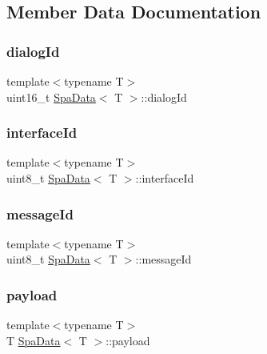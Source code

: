 \subsection{Member Data Documentation}
\mbox{\label{structSpaData_ac0b96669c8271ace6706c70008c59981}} 
\subsubsection{\texorpdfstring{dialog\+Id}{dialogId}}
{\footnotesize\ttfamily template$<$typename T$>$ \\
uint16\+\_\+t \hyperlink{structSpaData}{Spa\+Data}$<$ T $>$\+::dialog\+Id}

\mbox{\label{structSpaData_a4058e924739e721a3a006db80e609576}} 
\subsubsection{\texorpdfstring{interface\+Id}{interfaceId}}
{\footnotesize\ttfamily template$<$typename T$>$ \\
uint8\+\_\+t \hyperlink{structSpaData}{Spa\+Data}$<$ T $>$\+::interface\+Id}

\mbox{\label{structSpaData_a3c59b61ef43032b50c40eea6807e074f}} 
\subsubsection{\texorpdfstring{message\+Id}{messageId}}
{\footnotesize\ttfamily template$<$typename T$>$ \\
uint8\+\_\+t \hyperlink{structSpaData}{Spa\+Data}$<$ T $>$\+::message\+Id}

\mbox{\label{structSpaData_a615546d992c6f12e9ac6f1f2db202be7}} 
\subsubsection{\texorpdfstring{payload}{payload}}
{\footnotesize\ttfamily template$<$typename T$>$ \\
T \hyperlink{structSpaData}{Spa\+Data}$<$ T $>$\+::payload}

